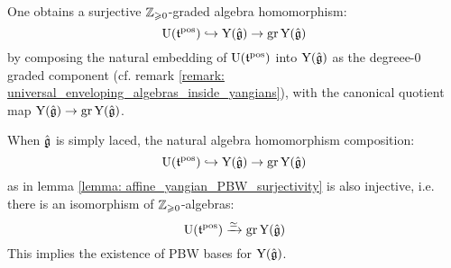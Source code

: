         \begin{lemma} \label{lemma: affine_yangian_PBW_surjectivity}
            One obtains a surjective $\mathbb{Z}_{\geqslant 0}$-graded algebra homomorphism:
                $$\mathrm{U}(\mathfrak{t}^{\mathrm{pos}}) \hookrightarrow \mathrm{Y}(\hat{\mathfrak{g}}) \to \operatorname{gr} \mathrm{Y}(\hat{\mathfrak{g}})$$
            by composing the natural embedding of $\mathrm{U}(\mathfrak{t}^{\mathrm{pos}})$ into $\mathrm{Y}(\hat{\mathfrak{g}})$ as the degreee-$0$ graded component (cf. remark \ref{remark: universal_enveloping_algebras_inside_yangians}), with the canonical quotient map $\mathrm{Y}(\hat{\mathfrak{g}}) \to \operatorname{gr} \mathrm{Y}(\hat{\mathfrak{g}})$.
        \end{lemma}
        \begin{theorem} \label{theorem: affine_yangian_PBW}
            When $\hat{\mathfrak{g}}$ is simply laced, the natural algebra homomorphism composition:
                $$\mathrm{U}(\mathfrak{t}^{\mathrm{pos}}) \hookrightarrow \mathrm{Y}(\hat{\mathfrak{g}}) \to \operatorname{gr} \mathrm{Y}(\hat{\mathfrak{g}})$$
            as in lemma \ref{lemma: affine_yangian_PBW_surjectivity} is also injective, i.e. there is an isomorphism of $\mathbb{Z}_{\geqslant 0}$-algebras:
                $$\mathrm{U}(\mathfrak{t}^{\mathrm{pos}}) \xrightarrow[]{\simeq} \operatorname{gr} \mathrm{Y}(\hat{\mathfrak{g}})$$
            This implies the existence of PBW bases for $\mathrm{Y}(\hat{\mathfrak{g}})$.
        \end{theorem}

